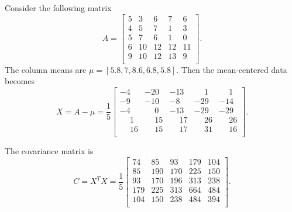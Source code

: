
\begin{example}
    \def\Amat{\begin{bmatrix}
        5 &  3 &  6 &  7 &  6 \\
        4 &  5 &  7 &  1 &  3 \\
        5 &  7 &  6 &  1 &  0 \\
        6 & 10 & 12 & 12 & 11 \\
        9 & 10 & 12 & 13 &  9 \\
    \end{bmatrix}}
    Consider the following matrix \[A = \Amat.\]
    The column means are \(\mu = [5.8,7,8.6,6.8,5.8]\).
    Then the mean-centered data becomes
    \def\-{\phantom{-}}
    \[X = A - \mu = \frac{1}{5}\begin{bmatrix}
            -4 &   -20 &   -13 &   \-1 &   \-1 \\
            -9 &   -10 &    -8 &   -29 &   -14 \\
            -4 &   \-0 &   -13 &   -29 &   -29 \\
            \-1 &  \-15 &  \-17 &  \-26 &  \-26 \\
        \-16 &  \-15 &  \-17 &  \-31 &  \-16 \\
    \end{bmatrix}.\]

    The covariance matrix is
    \[C = X^TX = \frac{1}{5}\begin{bmatrix}
            74 &  85 &  93 & 179 & 104 \\
            85 & 190 & 170 & 225 & 150 \\
            93 & 170 & 196 & 313 & 238 \\
        179 & 225 & 313 & 664 & 484 \\
        104 & 150 & 238 & 484 & 394 \\
    \end{bmatrix}.\]
    

\end{example}
